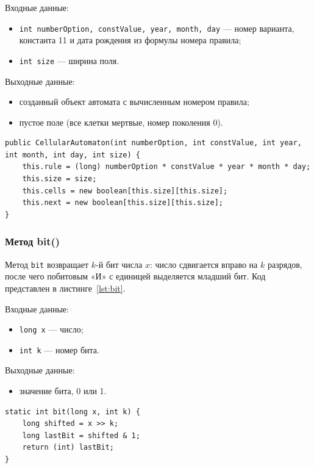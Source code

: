 Входные данные:
\begin{itemize}
	\item \texttt{int numberOption, constValue, year, month, day} --- номер варианта, константа 11 и дата рождения из формулы номера правила;
	\item \texttt{int size} --- ширина поля.
\end{itemize}

Выходные данные:
\begin{itemize}
	\item созданный объект автомата с вычисленным номером правила;
	\item пустое поле (все клетки мертвые, номер поколения 0).
\end{itemize}

\begin{lstlisting}[caption={Конструктор класса CellularAutomaton}, label={lst:ctor}]
public CellularAutomaton(int numberOption, int constValue, int year, int month, int day, int size) {
	this.rule = (long) numberOption * constValue * year * month * day;
	this.size = size;
	this.cells = new boolean[this.size][this.size];
	this.next = new boolean[this.size][this.size];
}
\end{lstlisting}

\subsubsection*{Метод bit()}

Метод \texttt{bit} возвращает $k$-й бит числа $x$: число сдвигается вправо на $k$ разрядов, после чего побитовым «И» с единицей выделяется младший бит. Код представлен в листинге~\ref{lst:bit}.

Входные данные:
\begin{itemize}
	\item \texttt{long x} --- число;
	\item \texttt{int k} --- номер бита.
\end{itemize}

Выходные данные:
\begin{itemize}
	\item значение бита, 0 или 1.
\end{itemize}

\begin{lstlisting}[caption={Метод bit()}, label={lst:bit}]
static int bit(long x, int k) {
	long shifted = x >> k;
	long lastBit = shifted & 1;
	return (int) lastBit;
}
\end{lstlisting}

